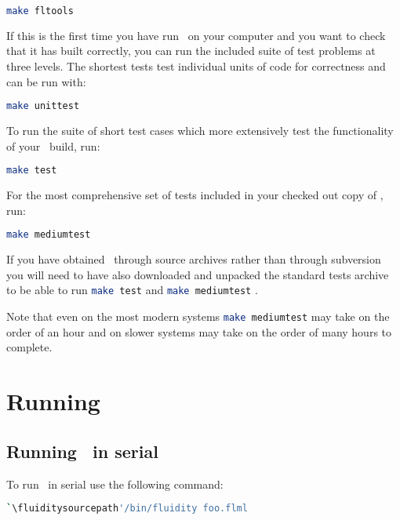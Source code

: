 \begin{lstlisting}[language=Bash]
make fltools
\end{lstlisting}

If this is the first time you have run \fluidity\ on your computer and you want
to check that it has built correctly, you can run the included suite of test
problems at three levels. The shortest tests test individual units of code for
correctness and can be run with:

\begin{lstlisting}[language=Bash]
make unittest
\end{lstlisting}

To run the suite of short test cases which more extensively test the
functionality of your \fluidity\ build, run:

\begin{lstlisting}[language=Bash]
make test
\end{lstlisting}

For the most comprehensive set of tests included in your checked out copy of
\fluidity, run:

\begin{lstlisting}[language=Bash]
make mediumtest
\end{lstlisting}

If you have obtained \fluidity\ through source archives rather than through
subversion you will need to have also downloaded and unpacked the standard
tests archive to be able to run \lstinline[language=Bash]+make test+ and
\lstinline[language=Bash]+make mediumtest+ .

Note that even on the most modern systems
\lstinline[language=Bash]+make mediumtest+ may take on the order of an hour and
on slower systems may take on the order of many hours to complete.


\section{Running \fluidity}
\label{sec:running_fluidity}


\subsection{Running \fluidity\ in serial}
\label{sec:running_fluidity_in_serial}

To run \fluidity\ in serial use the following command:

\begin{lstlisting}[language=bash]
`\fluiditysourcepath'/bin/fluidity foo.flml
\end{lstlisting}

